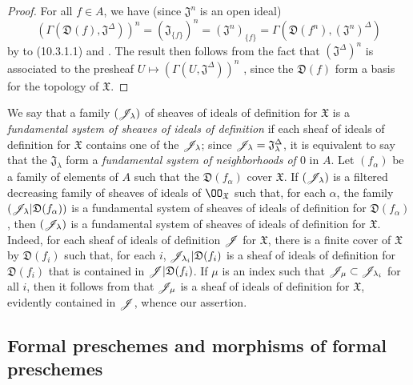 \begin{proof}
\label{proof-1.10.3.6}
For all $f\in A$, we have (since $\mathfrak{J}^n$ is an open ideal)
\[
  (\Gamma(\mathfrak{D}(f),\mathfrak{J}^\Delta))^n=(\mathfrak{J}_{\{f\}})^n=(\mathfrak{J}^n)_{\{f\}}=\Gamma(\mathfrak{D}(f^n),(\mathfrak{J}^n)^\Delta)
\]
by to (10.3.1.1) and .
The result then follows from the fact that $(\mathfrak{J}^\Delta)^n$ is associated to the presheaf $U\mapsto(\Gamma(U,\mathfrak{J}^\Delta))^n$ , since the $\mathfrak{D}(f)$ form a basis for the topology of $\mathfrak{X}$.
\end{proof}

\begin{env}[10.3.7]
\label{1.10.3.7}
We say that a family $(\mathscr{J}_\lambda)$ of sheaves of ideals of definition for $\mathfrak{X}$ is a \emph{fundamental system of sheaves of ideals of definition} if each sheaf of ideals of definition for $\mathfrak{X}$ contains one of the $\mathscr{J}_\lambda$; since $\mathscr{J}_\lambda=\mathfrak{J}_\lambda^\Delta$, it is equivalent to say that the $\mathfrak{J}_\lambda$ form a \emph{fundamental system of neighborhoods of $0$} in $A$.
Let $(f_\alpha)$ be a family of elements of $A$ such that the $\mathfrak{D}(f_\alpha)$ cover $\mathfrak{X}$.
If $(\mathscr{J}_\lambda)$ is a filtered decreasing family of sheaves of ideals of $\OO_\mathfrak{X}$ such that, for each $\alpha$, the family $(\mathscr{J}_\lambda|\mathfrak{D}(f_\alpha))$ is a fundamental system of sheaves of ideals of definition for $\mathfrak{D}(f_\alpha)$, then $(\mathscr{J}_\lambda)$ is a fundamental system of sheaves of ideals of definition for $\mathfrak{X}$.
Indeed, for each sheaf of ideals of definition $\mathscr{J}$ for $\mathfrak{X}$, there is a finite cover of $\mathfrak{X}$ by $\mathfrak{D}(f_i)$ such that, for each $i$, $\mathscr{J}_{\lambda_i}|\mathfrak{D}(f_i)$ is a sheaf of ideals of definition for $\mathfrak{D}(f_i)$ that is contained in $\mathscr{J}|\mathfrak{D}(f_i)$.
If $\mu$ is an index such that $\mathscr{J}_\mu\subset\mathscr{J}_{\lambda_i}$ for all $i$, then it follows from  that $\mathscr{J}_\mu$ is a sheaf of ideals of definition for $\mathfrak{X}$, evidently contained in $\mathscr{J}$, whence our assertion.
\end{env}

\subsection{Formal preschemes and morphisms of formal preschemes}
\label{subsection:1.10.4}

